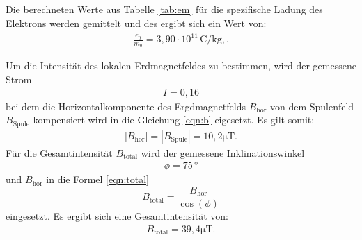 Die berechneten Werte aus Tabelle \ref{tab:em}
für die spezifische Ladung des Elektrons werden gemittelt
und des ergibt sich ein Wert von:
\begin{align*}
\overline{\frac{e_0}{m_0}}=3,90\cdot 10^{11}\,\si{\coulomb\per\kilo\gram},.
\end{align*}


Um die Intensität des lokalen Erdmagnetfeldes
zu bestimmen, wird der gemessene Strom
\begin{align*}
I=0,16
\end{align*}
bei dem die Horizontalkomponente
des Ergdmagnetfelds $B_\mathrm{hor}$
von dem Spulenfeld $B_\mathrm{Spule} $ kompensiert wird in die
Gleichung \eqref{eqn:b} eigesetzt.
Es gilt somit:
\begin{align*}
|B_\mathrm{hor}|=|B_\mathrm{Spule}|=10,2\si{\micro\tesla} .
\end{align*}
Für die Gesamtintensität $B_\mathrm{total}$
wird der gemessene Inklinationswinkel
\begin{align*}
  \phi=75\,\si{\degree}
\end{align*}
und $B_\mathrm{hor}$ in die Formel \eqref{eqn:total}
\begin{equation}
 B_\mathrm{total}=\frac{B_\mathrm{hor}}{\cos(\phi)} \label{eqn:total}
\end{equation}
eingesetzt.
Es ergibt sich eine Gesamtintensität von:
\begin{align*}
  B_\mathrm{total}=39,4\si{\micro\tesla}.
\end{align*}
